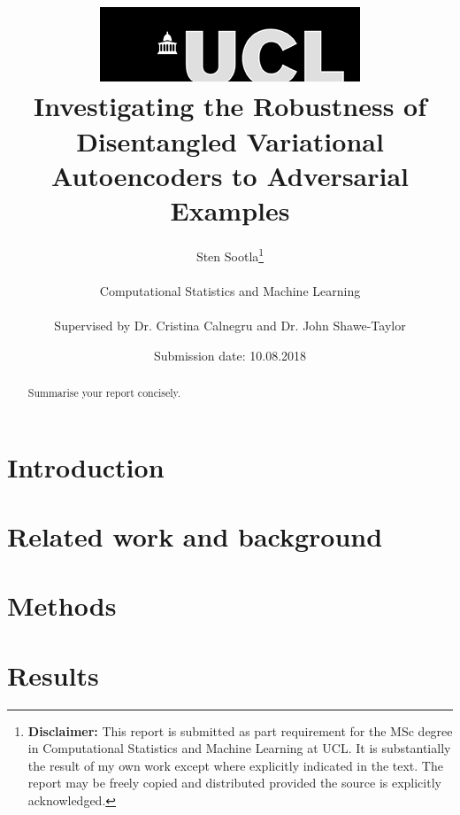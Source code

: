 \documentclass{report}
\title{  	{ \includegraphics[scale=.5,natwidth=294,natheight=84]{ucl_logo.png}}\\
{{\Huge Investigating the Robustness of Disentangled Variational Autoencoders to Adversarial Examples}}\\}
\date{Submission date: 10.08.2018}
\author{Sten Sootla\thanks{
{\bf Disclaimer:}
This report is submitted as part requirement for the MSc degree in Computational Statistics and Machine Learning at UCL. It is substantially the result of my own work except where explicitly indicated in the text. The report may be freely copied and distributed provided the source is explicitly acknowledged.}
\\ \\
Computational Statistics and Machine Learning\\ \\
Supervised by Dr. Cristina Calnegru and Dr. John Shawe-Taylor
}
\begin{document}
 
\onehalfspacing
\maketitle
\begin{abstract}
Summarise your report concisely.
\end{abstract}
\tableofcontents
\setcounter{page}{1}


\chapter{Introduction}

\chapter{Related work and background}

\chapter{Methods}

\chapter{Results}
\end{document}
